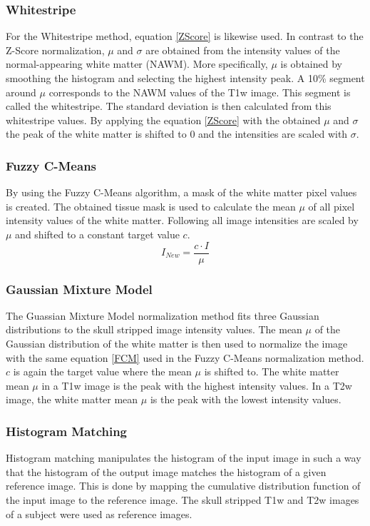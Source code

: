 \documentclass[article]{IEEEtran}
\begin{document}
	\subsubsection{Whitestripe}
	For the Whitestripe method, equation \ref{ZScore} is likewise used. In contrast to the Z-Score normalization, $\mu$ and $\sigma$ are obtained from the intensity values of the normal-appearing white matter (NAWM). 
	More specifically, $\mu$ is obtained by smoothing the histogram and selecting the highest intensity peak. A 10\% segment around $\mu$ corresponds to the NAWM values of the T1w image. This segment is called the whitestripe.
	The standard deviation is then calculated from this whitestripe values.
	By applying the equation \ref{ZScore} with the obtained $\mu$ and $\sigma$ the peak of the white matter is shifted to 0 and the intensities are scaled with $\sigma$.
	\smallskip
		
	\subsubsection{Fuzzy C-Means}
	By using the Fuzzy C-Means algorithm, a mask of the white matter pixel values is created. 
	The obtained tissue mask is used to calculate the mean $\mu$ of all pixel intensity values of the white matter.
	Following all image intensities are scaled by $\mu$ and shifted to a constant target value $c$.
		\begin{equation}\label{FCM}
			I_{New} = \frac{c \cdot I}{\mu}
		\end{equation}
	
	\subsubsection{Gaussian Mixture Model}
	The Guassian Mixture Model normalization method fits three Gaussian distributions to the skull stripped image intensity values. 
	The mean $\mu$ of the Gaussian distribution of the white matter is then used to normalize the image with the same equation \ref{FCM} used in the Fuzzy C-Means normalization method. 
	$c$ is again the target value where the mean $\mu$ is shifted to. 
	The white matter mean $\mu$ in a T1w image is the peak with the highest intensity values. 
	In a T2w image, the white matter mean $\mu$ is the peak with the lowest intensity values. 
	\smallskip

	\subsubsection{Histogram Matching}
	Histogram matching manipulates the histogram of the input image in such a way that the histogram of the output image matches the histogram of a given reference image. 
	This is done by mapping the cumulative distribution function of the input image to the reference image.
	The skull stripped T1w and T2w images of a subject were used as reference images. 
	\smallskip
	
\end{document}
